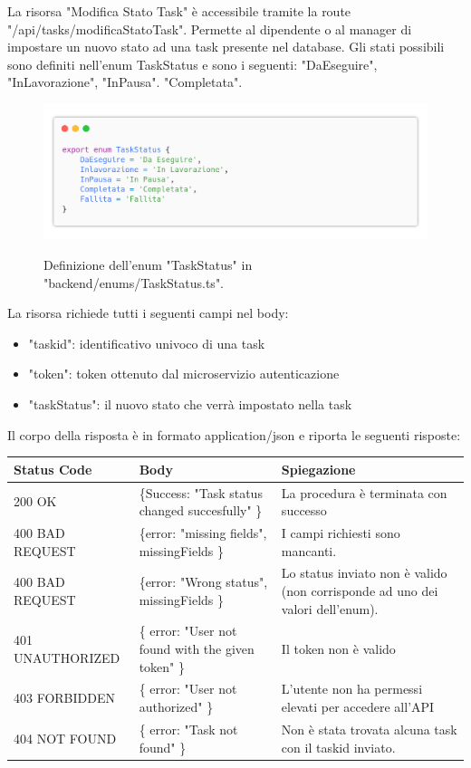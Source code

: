 \documentclass{report}
\begin{document}
La risorsa "Modifica Stato Task" è accessibile tramite la route "/api/tasks/modificaStatoTask". Permette al dipendente o al manager di impostare un nuovo stato ad una task presente nel database. Gli stati possibili sono definiti nell'enum TaskStatus e sono i seguenti: "DaEseguire", "InLavorazione", "InPausa". "Completata".

\begin{figure}[H]
	\centering\includegraphics[width=1\textwidth]{images/code_enum_taskStatus.png}
	
	Definizione dell'enum "TaskStatus" in "backend/enums/TaskStatus.ts".
\end{figure}

La risorsa richiede tutti i seguenti campi nel body:
\begin{itemize}
	\item "taskid": identificativo univoco di una task
	\item "token": token ottenuto dal microservizio autenticazione
	\item "taskStatus": il nuovo stato che verrà impostato nella task
\end{itemize}

Il corpo della risposta è in formato application/json e riporta le seguenti risposte:

\begin{center} %
	\centering
	\begin{tabular}{ |p{4cm}|p{4cm}|p{4cm}| }
		\hline
		\centering Status Code & \qquad\qquad\quad Body & \qquad\quad Spiegazione\\ %
		\hline
		200 OK & \{Success: "Task status changed succesfully" \}  & La procedura è terminata con successo	\\ 
		\hline
		400 BAD REQUEST & \{error: "missing fields", missingFields \} & I campi richiesti sono mancanti. \\
		\hline
		400 BAD REQUEST & \{error: "Wrong status", missingFields \} & Lo status inviato non è valido (non corrisponde ad uno dei valori dell'enum). \\
		\hline
		401 UNAUTHORIZED & \{ error: "User not found with the given token" \} & Il token non è valido \\
		\hline
		403 FORBIDDEN & \{ error: "User not authorized" \} &  L'utente non ha permessi elevati per accedere all'API \\
		\hline
		404 NOT FOUND & \{ error: "Task not found" \} & Non è stata trovata alcuna task con il taskid inviato. \\
		\hline
	\end{tabular}
\end{center}
\end{document}

